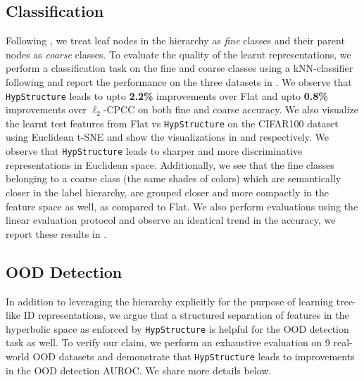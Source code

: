\subsection{Classification}
Following \citet{zeng2022learning}, we treat leaf nodes in the hierarchy as \emph{fine} classes and their parent nodes as \emph{coarse} classes. To evaluate the quality of the learnt representations, we perform a classification task on the fine and coarse classes using a kNN-classifier following \citep{he2020momentum, wu2018unsupervised, caron2020unsupervised, zhuang2019local} and report the performance on the three datasets in . We observe that \texttt{HypStructure} leads to upto \textbf{2.2\%} improvements over Flat and upto \textbf{0.8\%} improvements over $\ell_2$-CPCC on both fine and coarse accuracy. We also visualize the learnt test features from Flat vs \texttt{HypStructure} on the CIFAR100 dataset using Euclidean t-SNE \citep{van2008visualizing} and show the visualizations in  and  respectively. We observe that \texttt{HypStructure} leads to sharper and more discriminative representations in Euclidean space. Additionally, we see that the fine classes belonging to a coarse class (the same shades of colors) which are semantically closer in the label hierarchy, are grouped closer and more compactly in the feature space as well, as compared to Flat. We also perform evaluations using the linear evaluation protocol \citep{2020supcon} and observe an identical trend in the accuracy, we report these results in .


\subsection{OOD Detection}
In addition to leveraging the hierarchy explicitly for the purpose of learning tree-like ID representations, we argue that a structured separation of features in the hyperbolic space as enforced by \texttt{HypStructure} is helpful for the OOD detection task as well. To verify our claim, we perform an exhaustive evaluation on 9 real-world OOD datasets and demonstrate that \texttt{HypStructure} leads to improvements in the OOD detection AUROC. We share more details below.


